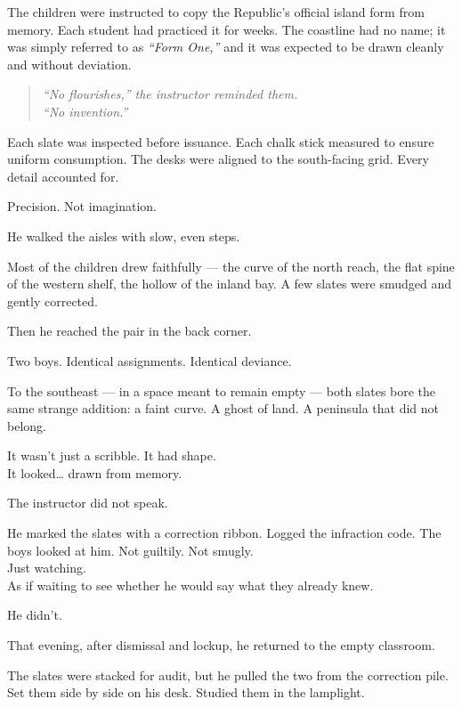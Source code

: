 \documentclass[12pt]{article}
\begin{document}
The children were instructed to copy the Republic’s official island form from memory. Each student had practiced it for weeks. The coastline had no name; it was simply referred to as \textit{“Form One,”} and it was expected to be drawn cleanly and without deviation.

\begin{quote}
\textit{“No flourishes,” the instructor reminded them.} \\
\textit{“No invention.”}
\end{quote}

Each slate was inspected before issuance. Each chalk stick measured to ensure uniform consumption. The desks were aligned to the south-facing grid. Every detail accounted for.

Precision. Not imagination.

\vspace{1em}

He walked the aisles with slow, even steps.

Most of the children drew faithfully --- the curve of the north reach, the flat spine of the western shelf, the hollow of the inland bay. A few slates were smudged and gently corrected.

Then he reached the pair in the back corner.

Two boys. Identical assignments. Identical deviance.

To the southeast --- in a space meant to remain empty --- both slates bore the same strange addition: a faint curve. A ghost of land. A peninsula that did not belong.

It wasn’t just a scribble. It had shape.\\
It looked… drawn from memory.

\vspace{1em}

The instructor did not speak.

He marked the slates with a correction ribbon. Logged the infraction code. The boys looked at him. Not guiltily. Not smugly.\\
Just watching.\\
As if waiting to see whether he would say what they already knew.

He didn’t.

\vspace{1em}

That evening, after dismissal and lockup, he returned to the empty classroom.

The slates were stacked for audit, but he pulled the two from the correction pile. Set them side by side on his desk. Studied them in the lamplight.
\end{document}
